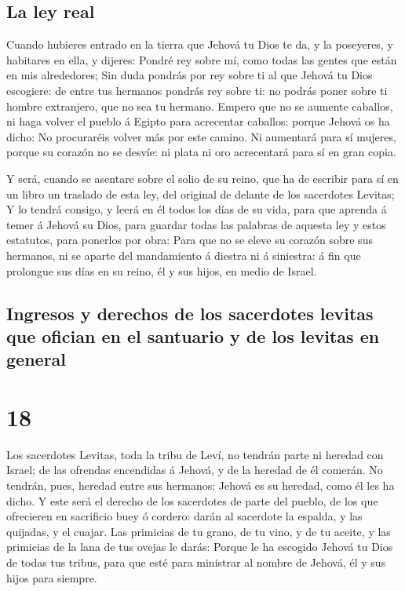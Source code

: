 \hypertarget{la-ley-real}{%
\subsection{La ley real}\label{la-ley-real}}

 Cuando hubieres entrado en la tierra que Jehová tu Dios
te da, y la poseyeres, y habitares en ella, y dijeres: Pondré rey sobre
mí, como todas las gentes que están en mis alrededores; 
Sin duda pondrás por rey sobre ti al que Jehová tu Dios escogiere: de
entre tus hermanos pondrás rey sobre ti: no podrás poner sobre ti hombre
extranjero, que no sea tu hermano.  Empero que no se
aumente caballos, ni haga volver el pueblo á Egipto para acrecentar
caballos: porque Jehová os ha dicho: No procuraréis volver más por este
camino.  Ni aumentará para sí mujeres, porque su corazón
no se desvíe: ni plata ni oro acrecentará para sí en gran copia.

 Y será, cuando se asentare sobre el solio de su reino,
que ha de escribir para sí en un libro un traslado de esta ley, del
original de delante de los sacerdotes Levitas;  Y lo
tendrá consigo, y leerá en él todos los días de su vida, para que
aprenda á temer á Jehová su Dios, para guardar todas las palabras de
aquesta ley y estos estatutos, para ponerlos por obra: 
Para que no se eleve su corazón sobre sus hermanos, ni se aparte del
mandamiento á diestra ni á siniestra: á fin que prolongue sus días en su
reino, él y sus hijos, en medio de Israel.

\hypertarget{ingresos-y-derechos-de-los-sacerdotes-levitas-que-ofician-en-el-santuario-y-de-los-levitas-en-general}{%
\subsection{Ingresos y derechos de los sacerdotes levitas que ofician en
el santuario y de los levitas en
general}\label{ingresos-y-derechos-de-los-sacerdotes-levitas-que-ofician-en-el-santuario-y-de-los-levitas-en-general}}

\hypertarget{section-17}{%
\section{18}\label{section-17}}

 Los sacerdotes Levitas, toda la tribu de Leví, no tendrán
parte ni heredad con Israel; de las ofrendas encendidas á Jehová, y de
la heredad de él comerán.  No tendrán, pues, heredad entre
sus hermanos: Jehová es su heredad, como él les ha dicho. 
Y este será el derecho de los sacerdotes de parte del pueblo, de los que
ofrecieren en sacrificio buey ó cordero: darán al sacerdote la espalda,
y las quijadas, y el cuajar.  Las primicias de tu grano,
de tu vino, y de tu aceite, y las primicias de la lana de tus ovejas le
darás:  Porque le ha escogido Jehová tu Dios de todas tus
tribus, para que esté para ministrar al nombre de Jehová, él y sus hijos
para siempre.

